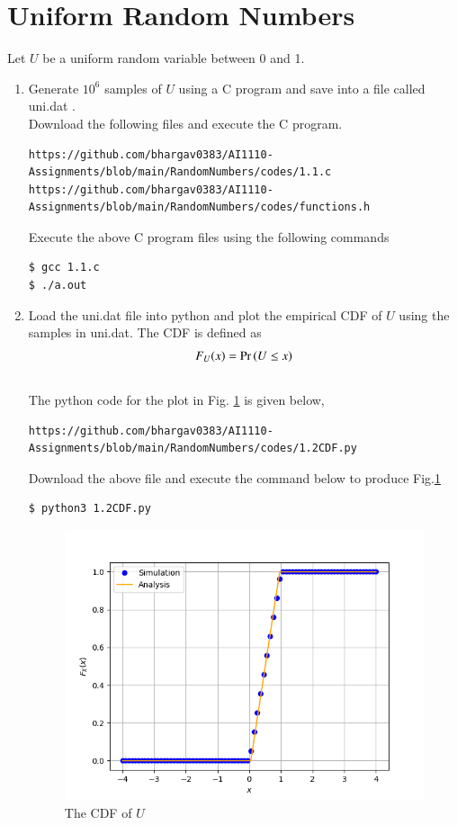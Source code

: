 \documentclass[journal,12pt,twocolumn]{IEEEtran}
\renewcommand\thesection{\arabic{section}}
\begin{document}
\section{Uniform Random Numbers}
Let $U$ be a uniform random variable between 0 and 1.
\begin{enumerate}[label=\thesection.\arabic*
,ref=\thesection.\theenumi]

\item Generate $10^6$ samples of $U$ using a C program and save into a file called uni.dat .
\\
\solution Download the following files and execute the  C program.
\begin{lstlisting}
https://github.com/bhargav0383/AI1110-Assignments/blob/main/RandomNumbers/codes/1.1.c
https://github.com/bhargav0383/AI1110-Assignments/blob/main/RandomNumbers/codes/functions.h
\end{lstlisting}
Execute the above C program files using the following commands
\begin{lstlisting}
$ gcc 1.1.c
$ ./a.out
\end{lstlisting}

\item
Load the uni.dat file into python and plot the empirical CDF of $U$ using the samples in uni.dat. The CDF is defined as
\begin{align}
F_{U}(x) = \Pr\left(U \le x\right)
\end{align}
\\
\solution  The python code for the plot in Fig. \ref{fig:1.2} is given below,
\begin{lstlisting}
https://github.com/bhargav0383/AI1110-Assignments/blob/main/RandomNumbers/codes/1.2CDF.py
\end{lstlisting}
Download the above file and execute the command below to produce Fig.\ref{fig:1.2}
\begin{lstlisting}
$ python3 1.2CDF.py
\end{lstlisting}
\begin{figure}[!h]
\centering
\includegraphics[width=\columnwidth]{./figs/1.2CDF.png}
\caption{The CDF of $U$}
\label{fig:1.2}
\end{figure}
%


\end{enumerate}
\end{document}

